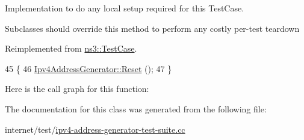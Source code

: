 Implementation to do any local setup required for this Test\+Case. 

Subclasses should override this method to perform any costly per-\/test teardown 

Reimplemented from \hyperlink{classns3_1_1TestCase_a8917f1604e28d312a8086f76291e3c46}{ns3\+::\+Test\+Case}.


\begin{DoxyCode}
45 \{
46   \hyperlink{group__config_ga2c1b65724f42f8c72276d7e7ad6df6db}{Ipv4AddressGenerator::Reset} ();
47 \}
\end{DoxyCode}


Here is the call graph for this function\+:




The documentation for this class was generated from the following file\+:\begin{DoxyCompactItemize}
\item 
internet/test/\hyperlink{ipv4-address-generator-test-suite_8cc}{ipv4-\/address-\/generator-\/test-\/suite.\+cc}\end{DoxyCompactItemize}
